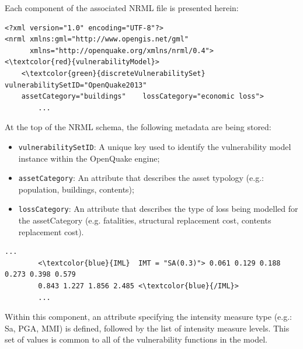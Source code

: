Each component of the associated NRML file is presented herein:
 
\begin{Verbatim}[frame=single, commandchars=\\\{\}, samepage=true]
<?xml version="1.0" encoding="UTF-8"?>
<nrml xmlns:gml="http://www.opengis.net/gml"
      xmlns="http://openquake.org/xmlns/nrml/0.4">
<\textcolor{red}{vulnerabilityModel}>
    <\textcolor{green}{discreteVulnerabilitySet} vulnerabilitySetID="OpenQuake2013"	
    assetCategory="buildings"    lossCategory="economic loss">
        ...
\end{Verbatim}

At the top of the NRML schema, the following metadata are being stored:
\begin{itemize}
\item  \Verb+vulnerabilitySetID+: A unique key used to identify the \gls{vulnerability model} instance within the OpenQuake engine;
\item  \Verb+assetCategory+: An attribute that describes the asset typology (e.g.: population, buildings, contents);
\item  \Verb+lossCategory+: An attribute that describes the type of loss being modelled for the assetCategory (e.g. fatalities, structural replacement cost, contents replacement cost). 
\end{itemize}

\begin{Verbatim}[frame=single, commandchars=\\\{\}, samepage=true]
    ...
        <\textcolor{blue}{IML}  IMT = "SA(0.3)"> 0.061 0.129 0.188 0.273 0.398 0.579 
        0.843 1.227 1.856 2.485 <\textcolor{blue}{/IML}>
        ...
\end{Verbatim}

Within this component, an attribute specifying the intensity measure type (e.g.: Sa, PGA, MMI) is defined, followed by the list of intensity measure levels. This set of values is common to all of the \glspl{vulnerability function} in the model.

